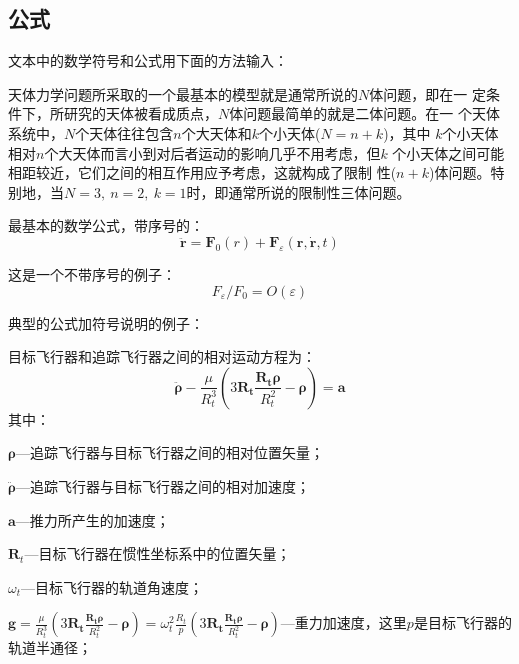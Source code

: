 \subsection{公式}
\label{Tricks:Equations}

文本中的数学符号和公式用下面的方法输入：

天体力学问题所采取的一个最基本的模型就是通常所说的$N$体问题，即在一
定条件下，所研究的天体被看成质点，$N$体问题最简单的就是二体问题。在一
个天体系统中，$N$个天体往往包含$n$个大天体和$k$个小天体($N=n+k$)，其中
$k$个小天体相对$n$个大天体而言小到对后者运动的影响几乎不用考虑，但$k$
个小天体之间可能相距较近，它们之间的相互作用应予考虑，这就构成了限制
性($n+k$)体问题。特别地，当$N=3,~n=2,~k=1$时，即通常所说的限制性三体问题。


最基本的数学公式，带序号的：
\begin{equation}
\ddot{\mathbf{r}}=\mathbf{F}_{0}(r)+\mathbf{F}_{\varepsilon}(\mathbf{r},\dot{\mathbf{r}},t)
\end{equation}

这是一个不带序号的例子：
\begin{displaymath}
F_{\varepsilon}/F_{0}=O (\varepsilon)
\end{displaymath}

\FloatBarrier %
典型的公式加符号说明的例子：

目标飞行器和追踪飞行器之间的相对运动方程为：
\begin{equation}\label{eq:1}
\ddot{\boldsymbol{\rho}}-\frac{\mu}{R_{t}^{3}}\left( 3\mathbf{R_{t}}\frac{\mathbf{R_{t}\rho}}{R_{t}^{2}}-\boldsymbol{\rho}\right)=\mathbf{a}
\end{equation}
其中：

$\boldsymbol{\rho}$---追踪飞行器与目标飞行器之间的相对位置矢量；

$\ddot{\boldsymbol{\rho}}$---追踪飞行器与目标飞行器之间的相对加速度；

$\mathbf{a}$---推力所产生的加速度；

$\mathbf{R}_{t}$---目标飞行器在惯性坐标系中的位置矢量；

$\omega_{t}$---目标飞行器的轨道角速度；

$\mathbf{g}=\frac{\mu}{R_{t}^{3}}\left(
3\mathbf{R_{t}}\frac{\mathbf{R_{t}\rho}}{R_{t}^{2}}-\boldsymbol{\rho}\right)=\omega_{t}^{2}\frac{R_{t}}{p}\left(
3\mathbf{R_{t}}\frac{\mathbf{R_{t}\rho}}{R_{t}^{2}}-\boldsymbol{\rho}\right)$---重力加速度，这里$p$是目标飞行器的轨道半通径；

